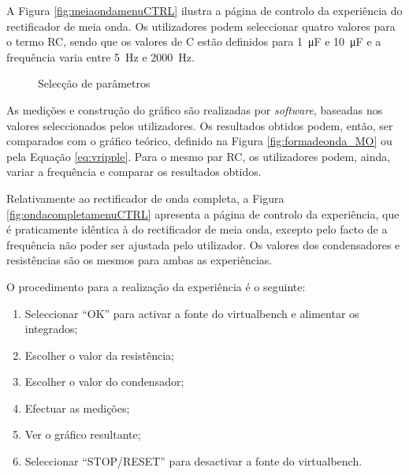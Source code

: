 A Figura \ref{fig:meiaondamenuCTRL} ilustra a página de controlo da experiência do rectificador de meia onda. Os utilizadores podem seleccionar quatro valores para o termo RC, sendo que os valores de C estão definidos para \SI{1}{\micro\farad} e \SI{10}{\micro\farad} e a frequência varia entre \SI{5}{\hertz} e \SI{2000}{\hertz}. 

\begin{figure}[hbtp]
	\centering%
		\centering
		\qquad
		\caption{Selecção de parâmetros}%
		\label{fig:seleccaoparametros}%
\end{figure}

As medições e construção do gráfico são realizadas por \textit{software}, baseadas nos valores seleccionados pelos utilizadores. Os resultados obtidos podem, então, ser comparados com o gráfico teórico, definido na Figura \ref{fig:formadeonda_MO} ou pela Equação \ref{eq:vripple}. Para o mesmo par RC, os utilizadores podem, ainda, variar a frequência e comparar os resultados obtidos.

Relativamente ao rectificador de onda completa, a Figura \ref{fig:ondacompletamenuCTRL} apresenta a página de controlo da experiência, que é praticamente idêntica à do rectificador de meia onda, excepto pelo facto de a frequência não poder ser ajustada pelo utilizador. Os valores dos condensadores e resistências são os mesmos para ambas as experiências.

O procedimento para a realização da experiência é o seguinte:
\begin{enumerate}
	\item Seleccionar ``OK'' para activar a fonte do \acrshort{virtualbench} e alimentar os integrados;
	\item Escolher o valor da resistência;
	\item Escolher o valor do condensador;
	\item Efectuar as medições;
	\item Ver o gráfico resultante;
	\item Seleccionar ``STOP/RESET'' para desactivar a fonte do \acrshort{virtualbench}.
\end{enumerate}

